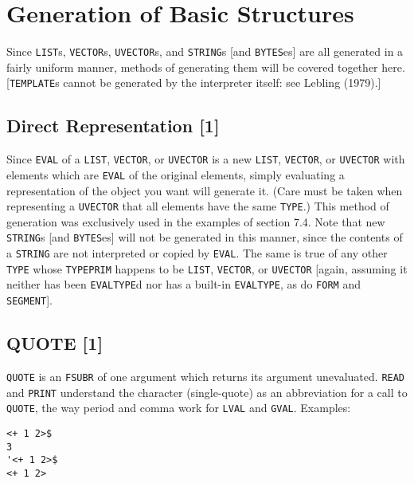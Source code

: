 \documentclass[a4paper]{scrbook}
\begin{document}
\section{Generation of Basic Structures}\label{generation-of-basic-structures}

Since \texttt{LIST}s, \texttt{VECTOR}s, \texttt{UVECTOR}s, and \texttt{STRING}s {[}and \texttt{BYTES}es{]} are all
generated in a fairly uniform manner, methods of generating them will be covered together here. {[}\texttt{TEMPLATE}s
cannot be generated by the interpreter itself: see Lebling (1979).{]}

\subsection{Direct Representation {[}1{]}}\label{direct-representation-1}

Since \texttt{EVAL} of a \texttt{LIST}, \texttt{VECTOR}, or \texttt{UVECTOR} is a new \texttt{LIST}, \texttt{VECTOR}, or
\texttt{UVECTOR} with elements which are \texttt{EVAL} of the original elements, simply evaluating a representation of the
object you want will generate it. (Care must be taken when representing a \texttt{UVECTOR} that all elements have the same
\texttt{TYPE}.) This method of generation was exclusively used in the examples of section 7.4. Note that new
\texttt{STRING}s {[}and \texttt{BYTES}es{]} will not be generated in this manner, since the contents of a \texttt{STRING}
are not interpreted or copied by \texttt{EVAL}. The same is true of any other \texttt{TYPE} whose \texttt{TYPEPRIM} happens
to be \texttt{LIST}, \texttt{VECTOR}, or \texttt{UVECTOR} {[}again, assuming it neither has been \texttt{EVALTYPE}d nor has
a built-in \texttt{EVALTYPE}, as do \texttt{FORM} and \texttt{SEGMENT}{]}.

\subsection{QUOTE {[}1{]}}\label{quote-1}

\texttt{QUOTE} is an \texttt{FSUBR} of one argument which returns its
argument unevaluated. \texttt{READ} and \texttt{PRINT} understand the character \texttt{\textquotesingle{}}
 (single-quote) as an abbreviation for a call to \texttt{QUOTE}, the way period and comma work for
\texttt{LVAL} and \texttt{GVAL}. Examples:

\begin{verbatim}
<+ 1 2>$
3
'<+ 1 2>$
<+ 1 2>
\end{verbatim}
\end{document}
